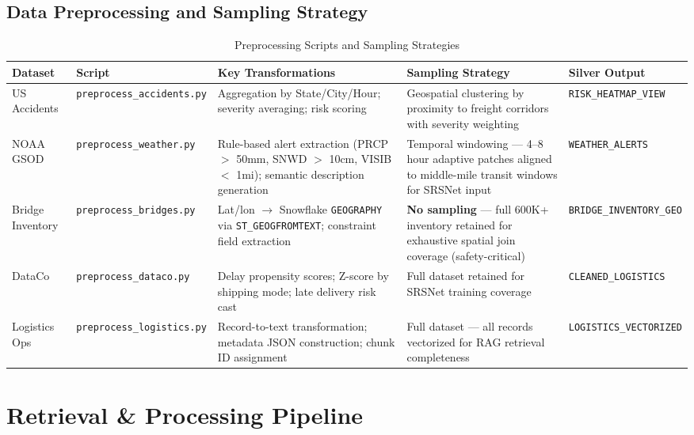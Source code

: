 \documentclass[14.5pt,letterpaper]{article}
\begin{document}
\subsection{Data Preprocessing and Sampling Strategy}

\begin{table}[H]
\centering
\caption{Preprocessing Scripts and Sampling Strategies}
\small
\begin{tabularx}{\textwidth}{@{}l l X X l@{}}
\toprule
\textbf{Dataset} & \textbf{Script} & \textbf{Key Transformations} & \textbf{Sampling Strategy} & \textbf{Silver Output} \\
\midrule
US Accidents & \texttt{preprocess\_accidents.py} & Aggregation by State/City/Hour; severity averaging; risk scoring & Geospatial clustering by proximity to freight corridors with severity weighting & \texttt{RISK\_HEATMAP\_VIEW} \\
\addlinespace
NOAA GSOD & \texttt{preprocess\_weather.py} & Rule-based alert extraction (PRCP $>$ 50mm, SNWD $>$ 10cm, VISIB $<$ 1mi); semantic description generation & Temporal windowing --- 4--8 hour adaptive patches aligned to middle-mile transit windows for SRSNet input & \texttt{WEATHER\_ALERTS} \\
\addlinespace
Bridge Inventory & \texttt{preprocess\_bridges.py} & Lat/lon $\rightarrow$ Snowflake \texttt{GEOGRAPHY} via \texttt{ST\_GEOGFROMTEXT}; constraint field extraction & \textbf{No sampling} --- full 600K+ inventory retained for exhaustive spatial join coverage (safety-critical) & \texttt{BRIDGE\_INVENTORY\_GEO} \\
\addlinespace
DataCo & \texttt{preprocess\_dataco.py} & Delay propensity scores; Z-score by shipping mode; late delivery risk cast & Full dataset retained for SRSNet training coverage & \texttt{CLEANED\_LOGISTICS} \\
\addlinespace
Logistics Ops & \texttt{preprocess\_logistics.py} & Record-to-text transformation; metadata JSON construction; chunk ID assignment & Full dataset --- all records vectorized for RAG retrieval completeness & \texttt{LOGISTICS\_VECTORIZED} \\
\bottomrule
\end{tabularx}
\end{table}

\newpage
\section{Retrieval \& Processing Pipeline}
\label{app:retrieval}
\end{document}
